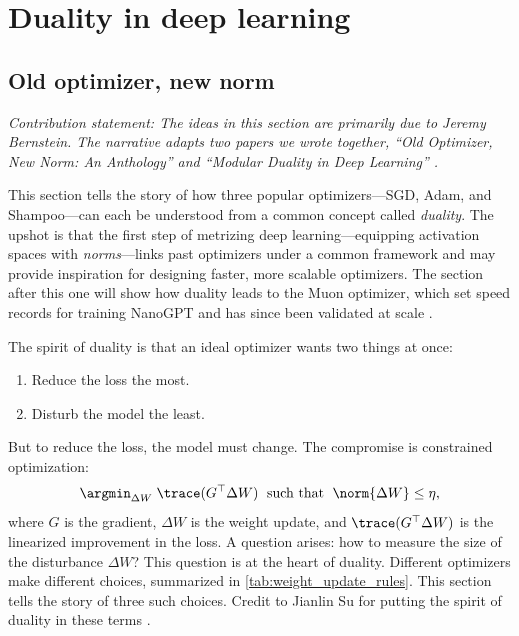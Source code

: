 \chapter{Duality in deep learning}
\label{sec:duality}

\section{Old optimizer, new norm}
\label{subsec:old-optimizer-new-norm}

\textit{Contribution statement: The ideas in this section are primarily due to Jeremy Bernstein. The narrative adapts two papers we wrote together, ``Old Optimizer, New Norm: An Anthology'' and ``Modular Duality in Deep Learning'' \citep{bernstein2024anthology,bernstein2024duality}.}

\vspace{1em}

This section tells the story of how three popular optimizers---SGD, Adam, and Shampoo---can each be understood from a common concept called \textit{duality}. The upshot is that the first step of metrizing deep learning---equipping activation spaces with \textit{norms}---links past optimizers under a common framework and may provide inspiration for designing faster, more scalable optimizers. The section after this one will show how duality leads to the Muon optimizer, which set speed records for training NanoGPT \citep{modded_nanogpt_2024} and has since been validated at scale \citep{liu2025muonscalablellmtraining,shah2025muonpretraining}.

The spirit of duality is that an ideal optimizer wants two things at once:
\begin{enumerate}
    \item Reduce the loss the most.
    \item Disturb the model the least.
\end{enumerate}
But to reduce the loss, the model must change. The compromise is constrained optimization:
\begin{equation}
    \argmin_{\Delta W} \; \trace(G^\top \Delta W) \; \text{ such that } \; \norm{\Delta W} \leq \eta,
\end{equation} where $G$ is the gradient, $\Delta W$ is the weight update, and $\trace(G^\top \Delta W)$ is the linearized improvement in the loss. A question arises: how to measure the size of the disturbance $\Delta W$? This question is at the heart of duality. Different optimizers make different choices, summarized in \cref{tab:weight_update_rules}. This section tells the story of three such choices. Credit to Jianlin Su for putting the spirit of duality in these terms \citep{kexuefm-10739}.

